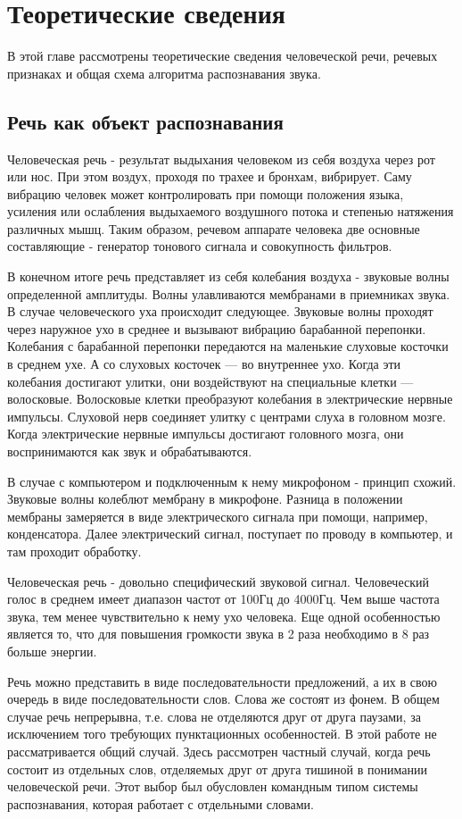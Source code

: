 \section{Теоретические сведения}
В этой главе рассмотрены теоретические сведения человеческой речи, речевых признаках и общая схема алгоритма распознавания звука.

\subsection{Речь как объект распознавания}
Человеческая речь - результат выдыхания человеком из себя воздуха через рот или нос. При этом воздух, проходя по трахее и бронхам, вибрирует. Саму вибрацию человек может контролировать при помощи положения языка, усиления или ослабления выдыхаемого воздушного потока и степенью натяжения различных мышц. Таким образом, речевом аппарате человека две основные составляющие - генератор тонового сигнала и совокупность фильтров.

В конечном итоге речь представляет из себя колебания воздуха - звуковые волны определенной амплитуды. Волны улавливаются мембранами в приемниках звука. В случае человеческого уха происходит следующее. Звуковые волны проходят через наружное ухо в среднее и вызывают вибрацию барабанной перепонки. Колебания с барабанной перепонки передаются на маленькие слуховые косточки в среднем ухе. А со слуховых косточек — во внутреннее ухо. Когда эти колебания достигают улитки, они воздействуют на специальные клетки — волосковые. Волосковые клетки преобразуют колебания в электрические нервные импульсы. Слуховой нерв соединяет улитку с центрами слуха в головном мозге. Когда электрические нервные импульсы достигают головного мозга, они воспринимаются как звук и обрабатываются.

В случае с компьютером и подключенным к нему микрофоном - принцип схожий. Звуковые волны колеблют мембрану в микрофоне. Разница в положении мембраны замеряется в виде электрического сигнала при помощи, например, конденсатора.  Далее электрический сигнал, поступает по проводу в компьютер, и там проходит обработку.

Человеческая речь - довольно специфический звуковой сигнал. Человеческий голос в среднем имеет диапазон частот от 100Гц до 4000Гц. Чем выше частота звука, тем менее чувствительно к нему ухо человека. Еще одной особенностью является то, что для повышения громкости звука в 2 раза необходимо в 8 раз больше энергии.

Речь можно представить в виде последовательности предложений, а их в свою очередь в виде последовательности слов. Слова же состоят из фонем. В общем случае речь непрерывна, т.е. слова не отделяются друг от друга паузами, за исключением того требующих пунктационных особенностей. В этой работе не рассматривается общий случай. Здесь рассмотрен частный случай, когда речь состоит из отдельных слов, отделяемых друг от друга тишиной в понимании человеческой речи. Этот выбор был обусловлен командным типом системы распознавания, которая работает с отдельными словами.

